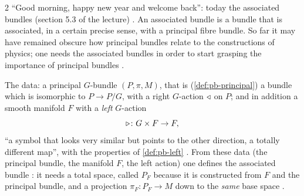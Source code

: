 \begin{paracol}{2}
``Good morning, happy new year and welcome back'': today the associated bundles (section 5.3 of the lecture) . An associated bundle is a bundle that is associated, in a certain precise sense, with a principal fibre bundle. So far it may have remained obscure how principal bundles relate to the constructions of physics; one needs the associated bundles in order to start grasping the importance of principal bundles  .

The data: a principal $G$-bundle $(P,\pi,M)$, that is (\cref{def:pb-principal}) a bundle which is isomorphic to $P\to P/G$, with a right $G$-action $\mathbin{\triangleleft}$ on $P$; and in addition a smooth manifold $F$ with a \emph{left} $G$-action
\[
  \mathbin{\triangleright}\colon G\times F\to F ,
\]
``a symbol that looks very similar but points to the other direction, a totally different map'', with the properties of \cref{def:pb-left}      . From these data (the principal bundle, the manifold $F$, the left action) one defines the associated bundle : it needs a total space, called $P_F$ because it is constructed from $F$ and the principal bundle, and a projection $\pi_F\colon P_F\to M$ down to the \emph{same} base space  .


\end{paracol}
